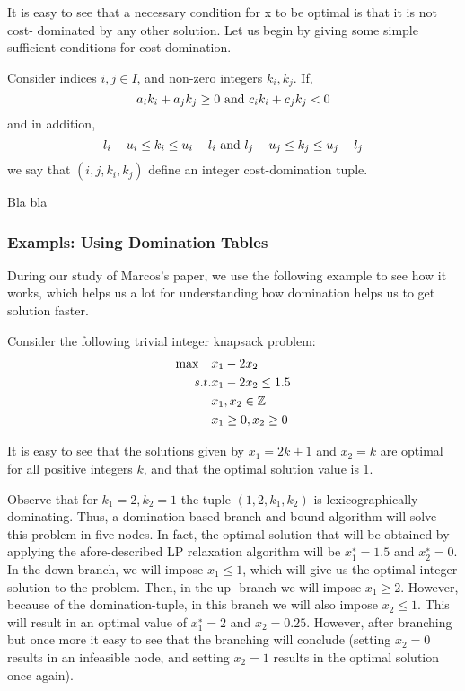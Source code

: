 \documentclass[a4paper,11pt]{article}
\begin{document}
It is easy to see that a necessary condition for x to be optimal is that it is not cost- dominated by any other solution. Let us begin by giving some simple sufficient conditions for cost-domination.

\begin{definition}
Consider indices $i,j\in I$, and non-zero integers $k_i, k_j$. If,
\begin{equation}
a_ik_i+a_jk_j\geq 0 ~\mbox{and}~ c_ik_i+c_jk_j <0
\end{equation}
and in addition,
\begin{equation}
l_i-u_i\leq k_i \leq u_i-l_i ~\mbox{and}~ l_j-u_j\leq k_j \leq u_j-l_j 
\end{equation}
we say that $(i,j,k_i,k_j)$ define an integer cost-domination tuple.
\end{definition}

Bla bla

\subsubsection{Exampls: Using Domination Tables }

During our study of Marcos's paper, we use the following example to see how it works, which helps us a lot for understanding how domination helps us to get solution faster.

Consider the following trivial integer knapsack problem:
\begin{align}
\max \quad&x_1-2x_2\\
s.t. & x_1-2x_2\leq1.5\notag\\
& x_1, x_2\in \mathbb Z \notag\\
& x_1 \geq0, x_2 \geq 0\notag
\end{align}

It is easy to see that the solutions given by $x_1 = 2k+1$ and $x_2 = k$ are optimal for all positive integers $k$, and that the optimal solution value is 1.

Observe that for $k_1 = 2, k_2 = 1$ the tuple $(1, 2, k_1, k_2)$ is lexicographically dominating. Thus, a domination-based branch and bound algorithm will solve this problem in five nodes. In fact, the optimal solution that will be obtained by applying the afore-described LP relaxation algorithm will be $x^∗_1 = 1.5$ and $x^∗_2 = 0$. In the down-branch, we will impose $x_1 ≤ 1$, which will give us the optimal integer solution to the problem. Then, in the up- branch we will impose $x_1 ≥ 2$. However, because of the domination-tuple, in this branch we will also impose $x_2 ≤ 1$. This will result in an optimal value of $x^∗_1 = 2$ and $x_2 = 0.25$. However, after branching but once more it easy to see that the branching will conclude (setting $x_2 = 0$ results in an infeasible node, and setting $x_2 = 1$ results in the optimal solution once again).
 
\end{document}
